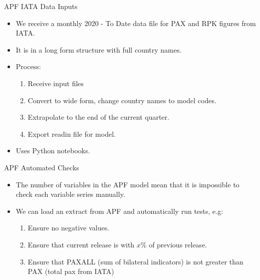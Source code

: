\documentclass[aspectratio=169]{beamer}
\begin{document}
\begin{frame}{APF IATA Data Inputs}

\begin{itemize}
 	\item We receive a monthly 2020 - To Date data file for PAX and RPK figures from IATA. 
 	\item It is in a long form structure with full country names.
 	\item Process:
 	\begin{enumerate}
 		\item Receive input files
 		\item Convert to wide form, change country names to model codes.
 		\item Extrapolate to the end of the current quarter.
 		\item Export readin file for model.	
 	\end{enumerate}
 	\item Uses Python notebooks.

\end{itemize}
	
\end{frame}


\begin{frame}{APF Automated Checks}

\begin{itemize}
	\item The number of variables in the APF model mean that it is impossible to check each variable series manually.
	\item We can load an extract from APF and automatically run tests, e.g:
	\begin{enumerate}
	\item Ensure no negative values.
	\item Ensure that current release is with $x \%$ of previous release.
	\item Ensure that PAXALL (sum of bilateral indicators) is not greater than PAX (total pax from IATA)
	\end{enumerate}
	\end{itemize}

	
\end{frame}





	
\end{document}
